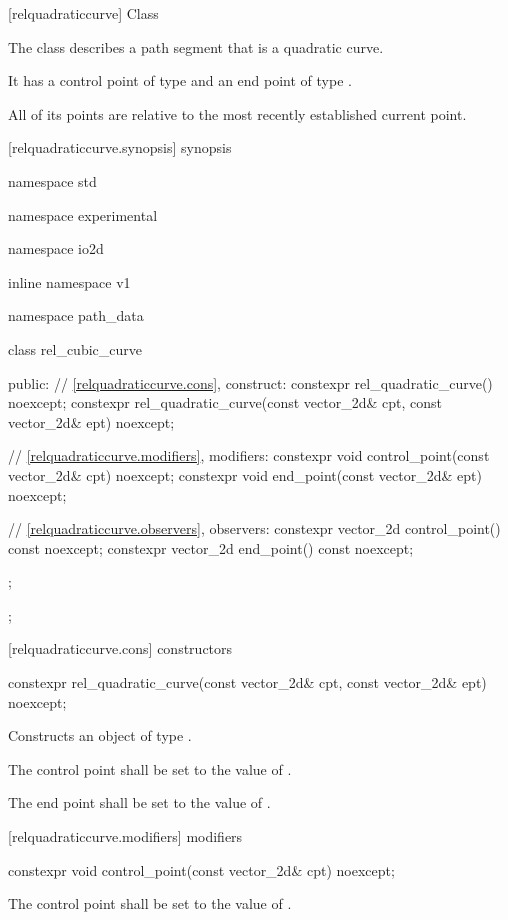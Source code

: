  [relquadraticcurve] {Class }

\pnum
{}
The class  describes a path segment that is a quadratic \bezierlocal curve.

\pnum
It has a control point of type  and an end point of type .

\pnum
All of its points are relative to the most recently established current point.

 [relquadraticcurve.synopsis] { synopsis}

\begin{codeblock}
namespace std { namespace experimental { namespace io2d { inline namespace v1 {
  namespace path_data {
    class rel_cubic_curve {
    public:
      // \ref{relquadraticcurve.cons}, construct:
      constexpr rel_quadratic_curve() noexcept;
      constexpr rel_quadratic_curve(const vector_2d& cpt, const vector_2d& ept)
        noexcept;

      // \ref{relquadraticcurve.modifiers}, modifiers:
      constexpr void control_point(const vector_2d& cpt) noexcept;
      constexpr void end_point(const vector_2d& ept) noexcept;

      // \ref{relquadraticcurve.observers}, observers:
      constexpr vector_2d control_point() const noexcept;
      constexpr vector_2d end_point() const noexcept;
    };
  };
} } } }
\end{codeblock}

 [relquadraticcurve.cons] { constructors}

\begin{itemdecl}
constexpr rel_quadratic_curve(const vector_2d& cpt, const vector_2d& ept)
  noexcept;
\end{itemdecl}
\begin{itemdescr}
\pnum
\effects
Constructs an object of type .

\pnum
The control point shall be set to the value of .

\pnum
The end point shall be set to the value of .
\end{itemdescr}

 [relquadraticcurve.modifiers]{ modifiers}

\begin{itemdecl}
constexpr void control_point(const vector_2d& cpt) noexcept;
\end{itemdecl}
\begin{itemdescr}
\pnum
\effects
The control point shall be set to the value of .
\end{itemdescr}

